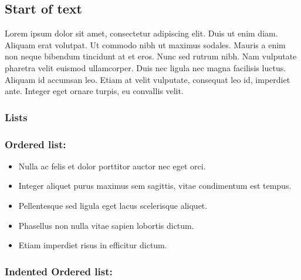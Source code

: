 \documentclass{article}
\begin{document}
\subsection{Start of text}\label{H1581297}

\texorpdfstring{\protect\hypertarget{H1581297}{}}{}

Lorem ipsum dolor sit amet, consectetur adipiscing elit. Duis ut enim diam. Aliquam erat volutpat. Ut commodo nibh ut maximus sodales. Mauris a enim non neque bibendum tincidunt at et eros. Nunc sed rutrum nibh. Nam vulputate pharetra velit euismod ullamcorper. Duis nec ligula nec magna facilisis luctus. Aliquam id accumsan leo. Etiam at velit vulputate, consequat leo id, imperdiet ante. Integer eget ornare turpis, eu convallis velit.


\subsubsection{Lists}\label{H2736763}



\subsubsection{Ordered list:}\label{H1860783}


\begin{itemize}
\item Nulla ac felis et dolor porttitor auctor nec eget orci.


\item Integer aliquet purus maximus sem sagittis, vitae condimentum est tempus.


\item Pellentesque sed ligula eget lacus scelerisque aliquet.


\item Phasellus non nulla vitae sapien lobortis dictum.


\item Etiam imperdiet risus in efficitur dictum.


\end{itemize}

\subsubsection{Indented Ordered list:}\label{H3077438}
\end{document}
